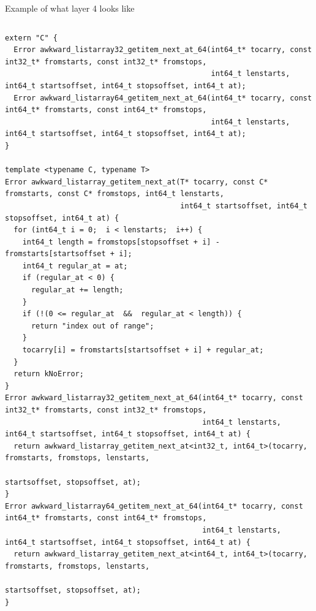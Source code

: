 \documentclass[aspectratio=169]{beamer}
\begin{document}
\begin{frame}[fragile]{Example of what layer 4 looks like}
\tiny
\vspace{0.05 cm}
\begin{columns}
\begin{verbatim}
extern "C" {
  Error awkward_listarray32_getitem_next_at_64(int64_t* tocarry, const int32_t* fromstarts, const int32_t* fromstops,
                                               int64_t lenstarts, int64_t startsoffset, int64_t stopsoffset, int64_t at);
  Error awkward_listarray64_getitem_next_at_64(int64_t* tocarry, const int64_t* fromstarts, const int64_t* fromstops,
                                               int64_t lenstarts, int64_t startsoffset, int64_t stopsoffset, int64_t at);
}

template <typename C, typename T>
Error awkward_listarray_getitem_next_at(T* tocarry, const C* fromstarts, const C* fromstops, int64_t lenstarts,
                                        int64_t startsoffset, int64_t stopsoffset, int64_t at) {
  for (int64_t i = 0;  i < lenstarts;  i++) {
    int64_t length = fromstops[stopsoffset + i] - fromstarts[startsoffset + i];
    int64_t regular_at = at;
    if (regular_at < 0) {
      regular_at += length;
    }
    if (!(0 <= regular_at  &&  regular_at < length)) {
      return "index out of range";
    }
    tocarry[i] = fromstarts[startsoffset + i] + regular_at;
  }
  return kNoError;
}
Error awkward_listarray32_getitem_next_at_64(int64_t* tocarry, const int32_t* fromstarts, const int32_t* fromstops,
                                             int64_t lenstarts, int64_t startsoffset, int64_t stopsoffset, int64_t at) {
  return awkward_listarray_getitem_next_at<int32_t, int64_t>(tocarry, fromstarts, fromstops, lenstarts,
                                                             startsoffset, stopsoffset, at);
}
Error awkward_listarray64_getitem_next_at_64(int64_t* tocarry, const int64_t* fromstarts, const int64_t* fromstops,
                                             int64_t lenstarts, int64_t startsoffset, int64_t stopsoffset, int64_t at) {
  return awkward_listarray_getitem_next_at<int64_t, int64_t>(tocarry, fromstarts, fromstops, lenstarts,
                                                             startsoffset, stopsoffset, at);
}
\end{verbatim}
\end{columns}
\end{frame}
\end{document}
